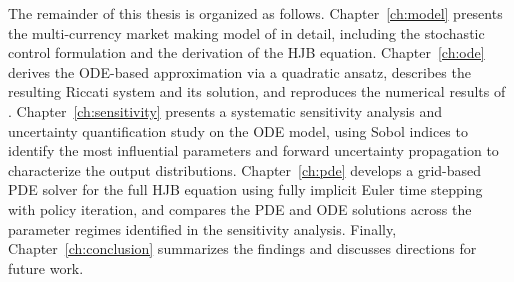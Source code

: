 The remainder of this thesis is organized as follows. Chapter~\ref{ch:model} presents the multi-currency market making model of \cite{barzykin2023} in detail, including the stochastic control formulation and the derivation of the HJB equation. Chapter~\ref{ch:ode} derives the ODE-based approximation via a quadratic ansatz, describes the resulting Riccati system and its solution, and reproduces the numerical results of \cite{barzykin2023}. Chapter~\ref{ch:sensitivity} presents a systematic sensitivity analysis and uncertainty quantification study on the ODE model, using Sobol indices to identify the most influential parameters and forward uncertainty propagation to characterize the output distributions. Chapter~\ref{ch:pde} develops a grid-based PDE solver for the full HJB equation using fully implicit Euler time stepping with policy iteration, and compares the PDE and ODE solutions across the parameter regimes identified in the sensitivity analysis. Finally, Chapter~\ref{ch:conclusion} summarizes the findings and discusses directions for future work.